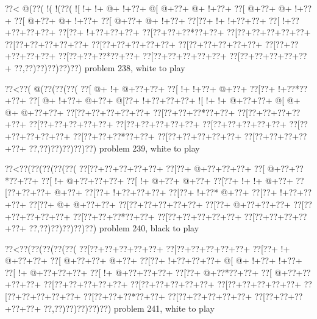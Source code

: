 \vbox{\vbox{\goo
\0??<\- @(\0??(\- !(\- !(\0??(
\- ![\- !+\- !+\- @+\- !+\0??+
\- @[\- @+\0??+\- @+\- !+\0??+
\0??[\- @+\0??+\- @+\- !+\0??+
\0??[\- @+\0??+\- @+\- !+\0??+
\0??[\- @+\0??+\- @+\- !+\0??+
\0??[\0??+\- !+\- !+\0??+\0??+
\0??[\- !+\0??+\0??+\0??+\0??+
\0??[\0??+\- !+\0??+\0??+\0??+
\0??[\0??+\0??+\0??*\0??+\0??+
\0??[\0??+\0??+\0??+\0??+\0??+
\0??[\0??+\0??+\0??+\0??+\0??+
\0??[\0??+\0??+\0??+\0??+\0??+
\0??[\0??+\0??+\0??+\0??+\0??+
\0??[\0??+\0??+\0??+\0??+\0??+
\0??[\0??+\0??+\0??*\0??+\0??+
\0??[\0??+\0??+\0??+\0??+\0??+
\0??[\0??+\0??+\0??+\0??+\0??+
\0??,\0??)\0??)\0??)\0??)\0??)
}
\hfil problem 238, white to play\hfil\break
}

\vbox{\vbox{\goo
\0??<\0??(\- @(\0??(\0??(\0??(
\0??[\- @+\- !+\- @+\0??+\0??+
\0??[\- !+\- !+\0??+\- @+\0??+
\0??[\0??+\- !+\0??*\0??+\0??+
\0??[\- @+\- !+\0??+\- @+\0??+
\- @[\0??+\- !+\0??+\0??+\0??+
\- ![\- !+\- !+\- @+\0??+\0??+
\- @[\- @+\- @+\- @+\0??+\0??+
\0??[\0??+\0??+\0??+\0??+\0??+
\0??[\0??+\0??+\0??*\0??+\0??+
\0??[\0??+\0??+\0??+\0??+\0??+
\0??[\0??+\0??+\0??+\0??+\0??+
\0??[\0??+\0??+\0??+\0??+\0??+
\0??[\0??+\0??+\0??+\0??+\0??+
\0??[\0??+\0??+\0??+\0??+\0??+
\0??[\0??+\0??+\0??*\0??+\0??+
\0??[\0??+\0??+\0??+\0??+\0??+
\0??[\0??+\0??+\0??+\0??+\0??+
\0??,\0??)\0??)\0??)\0??)\0??)
}
\hfil problem 239, white to play\hfil\break
}

\vbox{\vbox{\goo
\0??<\0??(\0??(\0??(\0??(\0??(
\0??[\0??+\0??+\0??+\0??+\0??+
\0??[\0??+\- @+\0??+\0??+\0??+
\0??[\- @+\0??+\0??*\0??+\0??+
\0??[\- !+\- @+\0??+\0??+\0??+
\0??[\- !+\- @+\0??+\- @+\0??+
\0??[\0??+\- !+\- !+\- @+\0??+
\0??[\0??+\0??+\0??+\- @+\0??+
\0??[\0??+\- !+\0??+\0??+\0??+
\0??[\0??+\- !+\0??*\- @+\0??+
\0??[\0??+\- !+\0??+\0??+\0??+
\0??[\0??+\- @+\- @+\0??+\0??+
\0??[\0??+\0??+\0??+\0??+\0??+
\0??[\0??+\- @+\0??+\0??+\0??+
\0??[\0??+\0??+\0??+\0??+\0??+
\0??[\0??+\0??+\0??*\0??+\0??+
\0??[\0??+\0??+\0??+\0??+\0??+
\0??[\0??+\0??+\0??+\0??+\0??+
\0??,\0??)\0??)\0??)\0??)\0??)
}
\hfil problem 240, black to play\hfil\break
}

\vbox{\vbox{\goo
\0??<\0??(\0??(\0??(\0??(\0??(
\0??[\0??+\0??+\0??+\0??+\0??+
\0??[\0??+\0??+\0??+\0??+\0??+
\0??[\0??+\- !+\- @+\0??+\0??+
\0??[\- @+\0??+\0??+\- @+\0??+
\0??[\0??+\- !+\0??+\0??+\0??+
\- @[\- @+\- !+\0??+\- !+\0??+
\0??[\- !+\- @+\0??+\0??+\0??+
\0??[\- !+\- @+\0??+\0??+\0??+
\0??[\0??+\- @+\0??*\0??+\0??+
\0??[\- @+\0??+\0??+\0??+\0??+
\0??[\0??+\0??+\0??+\0??+\0??+
\0??[\0??+\0??+\0??+\0??+\0??+
\0??[\0??+\0??+\0??+\0??+\0??+
\0??[\0??+\0??+\0??+\0??+\0??+
\0??[\0??+\0??+\0??*\0??+\0??+
\0??[\0??+\0??+\0??+\0??+\0??+
\0??[\0??+\0??+\0??+\0??+\0??+
\0??,\0??)\0??)\0??)\0??)\0??)
}
\hfil problem 241, white to play\hfil\break
}

